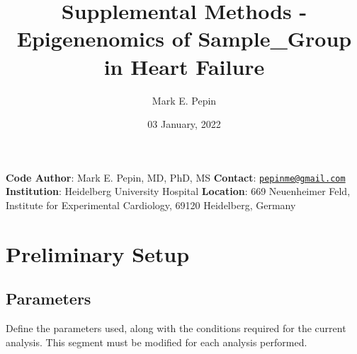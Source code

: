 \documentclass[
  10pt,
]{article}
\title{Supplemental Methods - Epigenenomics of Sample\_Group in Heart
Failure}
\author{Mark E. Pepin}
\date{03 January, 2022}
\begin{document}
\maketitle

{
\setcounter{tocdepth}{2}
\tableofcontents
}
\textbf{Code Author}: Mark E. Pepin, MD, PhD, MS \textbf{Contact}:
\href{mailto:pepinme@gmail.com}{\nolinkurl{pepinme@gmail.com}}
\textbf{Institution}: Heidelberg University Hospital \textbf{Location}:
669 Neuenheimer Feld, Institute for Experimental Cardiology, 69120
Heidelberg, Germany

\hypertarget{preliminary-setup}{%
\section{Preliminary Setup}\label{preliminary-setup}}

\hypertarget{parameters}{%
\subsection{Parameters}\label{parameters}}

Define the parameters used, along with the conditions required for the
current analysis. This segment must be modified for each analysis
performed.
\end{document}
